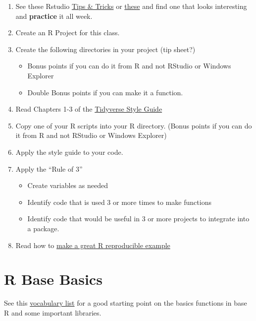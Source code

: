 \documentclass[]{book}
\providecommand{\tightlist}{%
  \setlength{\itemsep}{0pt}\setlength{\parskip}{0pt}}
\theoremstyle{definition}
\theoremstyle{definition}
\theoremstyle{definition}
\theoremstyle{remark}
\begin{document}
\begin{enumerate}
\def\labelenumi{\arabic{enumi}.}
\tightlist
\item
  See these Rstudio
  \href{https://rviews.rstudio.com/categories/tips-and-tricks/}{Tips \&
  Tricks} or \href{https://twitter.com/rstudiotips}{these} and find one
  that looks interesting and \textbf{practice} it all week.
\item
  Create an R Project for this class.
\item
  Create the following directories in your project (tip sheet?)

  \begin{itemize}
  \tightlist
  \item
    Bonus points if you can do it from R and not RStudio or Windows
    Explorer
  \item
    Double Bonus points if you can make it a function.
  \end{itemize}
\item
  Read Chapters 1-3 of the
  \href{http://style.tidyverse.org/index.html}{Tidyverse Style Guide}
\item
  Copy one of your R scripts into your R directory. (Bonus points if you
  can do it from R and not RStudio or Windows Explorer)
\item
  Apply the style guide to your code.\\
\item
  Apply the ``Rule of 3''

  \begin{itemize}
  \tightlist
  \item
    Create variables as needed
  \item
    Identify code that is used 3 or more times to make functions
  \item
    Identify code that would be useful in 3 or more projects to
    integrate into a package.
  \end{itemize}
\item
  Read how to
  \href{https://stackoverflow.com/questions/5963269/how-to-make-a-great-r-reproducible-example}{make
  a great R reproducible example}
\end{enumerate}

\chapter{R Base Basics}\label{r-base-basics}

See this \href{http://adv-r.had.co.nz/Vocabulary.html}{vocabulary list}
for a good starting point on the basics functions in base R and some
important libraries.
\end{document}
